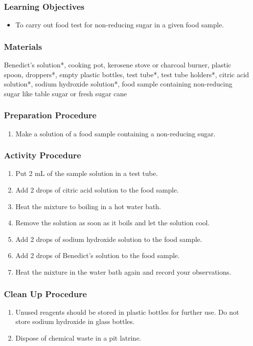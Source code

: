 \subsubsection*{Learning Objectives}
\begin{itemize}
\item{To carry out food test for non-reducing sugar in a given food sample.}
\end{itemize}

\subsubsection*{Materials}
Benedict's solution*, cooking pot, kerosene stove or charcoal burner, plastic spoon, droppers*, empty plastic bottles, test tube*, test tube holders*, citric acid solution*, sodium hydroxide solution*, food sample containing non-reducing sugar like table sugar or fresh sugar cane

\subsubsection*{Preparation Procedure}
\begin{enumerate}
\item{Make a solution of a food sample containing a non-reducing sugar.}
\end{enumerate}

\subsubsection*{Activity Procedure}
\begin{enumerate}
\item{Put 2 mL of the sample solution in a test tube.}
\item{Add 2 drops of citric acid solution to the food sample.}
\item{Heat the mixture to boiling in a hot water bath.}
\item{Remove the solution as soon as it boils and let the solution cool.}
\item{Add 2 drops of sodium hydroxide solution to the food sample.}
\item{Add 2 drops of Benedict's solution to the food sample.}
\item{Heat the mixture in the water bath again and record your observations.}
\end{enumerate}

\subsubsection*{Clean Up Procedure}
\begin{enumerate}
\item{Unused reagents should be stored in plastic bottles for further use. Do not store sodium hydroxide in glass bottles.}
\item{Dispose of chemical waste in a pit latrine.}
\end{enumerate}

